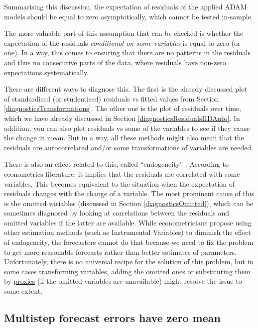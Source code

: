 \documentclass[
]{book}
\theoremstyle{definition}
\theoremstyle{definition}
\theoremstyle{definition}
\theoremstyle{definition}
\theoremstyle{remark}
\begin{document}
Summarising this discussion, the expectation of residuals of the applied ADAM models should be equal to zero asymptotically, which cannot be tested in-sample.

The more valuable part of this assumption that can be checked is whether the expectation of the residuals \emph{conditional on some variables} is equal to zero (or one). In a way, this comes to ensuring that there are no patterns in the residuals and thus no consecutive parts of the data, where residuals have non-zero expectations systematically.

There are different ways to diagnose this. The first is the already discussed plot of standardised (or studentised) residuals vs fitted values from Section \ref{diagnosticsTransformations}. The other one is the plot of residuals over time, which we have already discussed in Section \ref{diagnosticsResidualsIIDAuto}. In addition, you can also plot residuals vs some of the variables to see if they cause the change in mean. But in a way, all these methods might also mean that the residuals are autocorrelated and/or some transformations of variables are needed.

There is also an effect related to this, called ``endogeneity'' \citep[discussed briefly in Section 12.3 of][]{SvetunkovSBA}. According to econometrics literature, it implies that the residuals are correlated with some variables. This becomes equivalent to the situation when the expectation of residuals changes with the change of a variable. The most prominent cause of this is the omitted variables (discussed in Section \ref{diagnosticsOmitted}), which can be sometimes diagnosed by looking at correlations between the residuals and omitted variables if the latter are available. While econometricians propose using other estimation methods (such as Instrumental Variables) to diminish the effect of endogeneity, the forecasters cannot do that because we need to fix the problem to get more reasonable forecasts rather than better estimates of parameters. Unfortunately, there is no universal recipe for the solution of this problem, but in some cases transforming variables, adding the omitted ones or substituting them by \href{https://en.wikipedia.org/wiki/Proxy_(statistics)}{proxies} (if the omitted variables are unavailable) might resolve the issue to some extent.

\hypertarget{diagnosticsResidualsIIDExpectationMultiple}{%
\subsection{Multistep forecast errors have zero mean}\label{diagnosticsResidualsIIDExpectationMultiple}}
\end{document}
